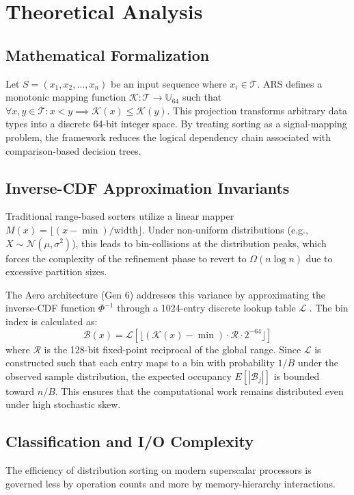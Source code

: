 \section{Theoretical Analysis}

\subsection{Mathematical Formalization}
Let $S = (x_1, x_2, \dots, x_n)$ be an input sequence where $x_i \in \mathcal{T}$. ARS defines a monotonic mapping function $\mathcal{K}: \mathcal{T} \to \mathbb{U}_{64}$ such that $\forall x, y \in \mathcal{T} : x < y \implies \mathcal{K}(x) \leq \mathcal{K}(y)$. This projection transforms arbitrary data types into a discrete 64-bit integer space. By treating sorting as a signal-mapping problem, the framework reduces the logical dependency chain associated with comparison-based decision trees.

\subsection{Inverse-CDF Approximation Invariants}
Traditional range-based sorters utilize a linear mapper $M(x) = \lfloor (x - \min) / \text{width} \rfloor$. Under non-uniform distributions (e.g., $X \sim \mathcal{N}(\mu, \sigma^2)$), this leads to bin-collisions at the distribution peaks, which forces the complexity of the refinement phase to revert to $\Omega(n \log n)$ due to excessive partition sizes. 

The Aero architecture (Gen 6) addresses this variance by approximating the inverse-CDF function $\Phi^{-1}$ through a 1024-entry discrete lookup table $\mathcal{L}$ \cite{devroyeNonUniformRandomVariate1986}. The bin index is calculated as:
\begin{equation}
\mathcal{B}(x) = \mathcal{L} \left[ \lfloor (\mathcal{K}(x) - \min) \cdot \mathcal{R} \cdot 2^{-64} \rfloor \right]
\end{equation}
where $\mathcal{R}$ is the 128-bit fixed-point reciprocal of the global range. Since $\mathcal{L}$ is constructed such that each entry maps to a bin with probability $1/B$ under the observed sample distribution, the expected occupancy $E[|\mathcal{B}_j|]$ is bounded toward $n/B$. This ensures that the computational work remains distributed even under high stochastic skew.

\subsection{Classification and I/O Complexity}
The efficiency of distribution sorting on modern superscalar processors is governed less by operation counts and more by memory-hierarchy interactions.


